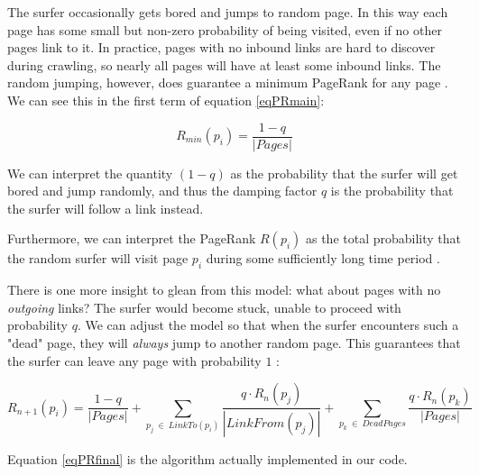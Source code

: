 The surfer occasionally gets bored and jumps to random page.  
In this way each page has some small but non-zero probability of being visited,
even if no other pages link to it.  In practice, pages with no inbound links are
hard to discover during crawling, so nearly all pages will have at least some
inbound links.  The random jumping, however, does guarantee a minimum PageRank
for any page \cite{efactory}. 
We can see this in the first term of equation \eqref{eqPRmain}:

\begin{equation}\label{eqPRmin}
    R_{min}(p_i) = \frac{1 - q}{|Pages|}
\end{equation}

We can interpret the quantity $(1 - q)$ as the probability that the surfer will
get bored and jump randomly, and thus the damping factor $q$ is the probability 
that the surfer will follow a link instead.

Furthermore, we can interpret the PageRank $R(p_i)$ as the total probability that
the random surfer will visit page $p_i$ during some sufficiently long time period \cite{efactory}.

There is one more insight to glean from this model: what about pages with no
\emph{outgoing} links?  The surfer would become stuck, unable to proceed with
probability $q$.  We can adjust the model so that when the surfer encounters such
a "dead" page, they will \emph{always} jump to another random page.  This guarantees
that the surfer can leave any page with probability $1$ \cite{mnielsen}:

\begin{equation}\label{eqPRfinal}
    R_{n+1}(p_i) = \frac{1 - q}{|Pages|} + \sum_{p_j \: \in \: LinkTo(p_i)} \frac{ q \cdot R_n(p_j) }{ |LinkFrom(p_j)| }  + \sum_{p_k \: \in \: DeadPages} \frac{ q \cdot R_n(p_k) }{ |Pages| } 
\end{equation}

Equation \eqref{eqPRfinal} is the algorithm actually implemented in our code.
